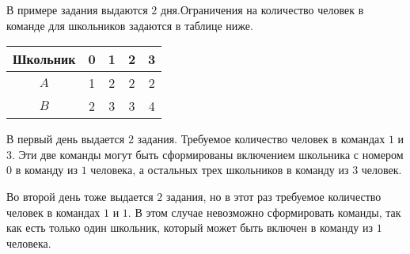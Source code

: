В примере задания выдаются $2$ дня.Ограничения на
 количество человек в команде для школьников задаются в таблице ниже.
\begin{tabular}{|c|c|c|c|c|}
\hline
Школьник & 0 & 1 & 2 & 3 \\
\hline
$A$ & 1 & 2 & 2 & 2 \\
\hline
$B$ & 2 & 3 & 3 & 4\\\hline
\end{tabular}
В первый день выдается $2$ задания. Требуемое количество человек в командах $1$ и $3$. Эти две
 команды могут быть сформированы включением школьника с номером $0$ в команду из $1$
 человека, а остальных трех школьников в команду из $3$ человек.

 Во второй день тоже выдается $2$ задания, но в этот раз требуемое количество человек в
 командах $1$ и $1$. В этом случае невозможно сформировать команды, так как есть только один
 школьник, который может быть включен в команду из $1$ человека.
 
